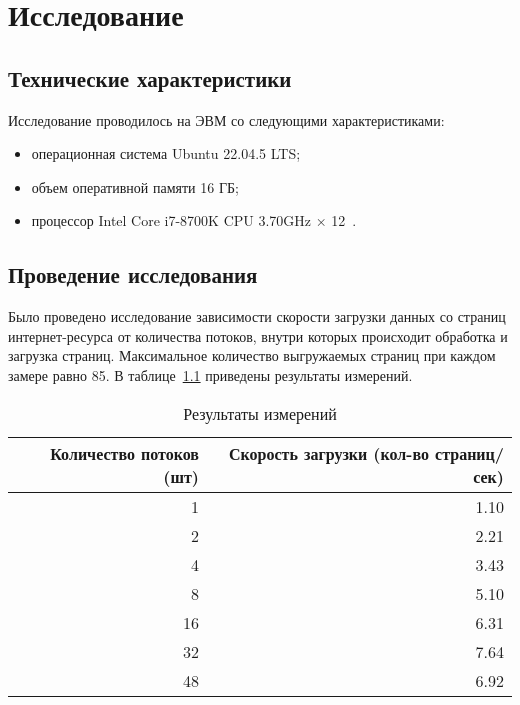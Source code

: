 \chapter{Исследование}

\section{Технические характеристики}

Исследование проводилось на ЭВМ со следующими характеристиками:
\begin{itemize}[label=--]
    \item операционная система Ubuntu 22.04.5 LTS;
    \item объем оперативной памяти 16 ГБ;
    \item процессор Intel Core i7-8700K CPU 3.70GHz × 12~\cite{processor}.
\end{itemize}

\section{Проведение исследования}

Было проведено исследование зависимости скорости загрузки данных со страниц интернет-ресурса от количества потоков, внутри которых происходит обработка и загрузка страниц. Максимальное количество выгружаемых страниц при каждом замере равно 85. В таблице~\ref{tbl:bench} приведены результаты измерений.

\begin{table}[ht]
    \small
    \begin{center}
        \begin{threeparttable}
            \caption{Результаты измерений}
            \label{tbl:bench}
            \begin{tabular}{|r|r|}
                \hline
                \textbf{Количество потоков (шт)} & \textbf{Скорость загрузки (кол-во страниц/сек)}  \\
                \hline
                1 & 1.10 \\
                \hline
                2 & 2.21 \\
                \hline
                4 & 3.43 \\
                \hline
                8 & 5.10 \\
                \hline
                16 & 6.31 \\
                \hline
                32 & 7.64 \\
                \hline
                48 & 6.92 \\
                \hline
            \end{tabular}
        \end{threeparttable}
    \end{center}
\end{table}

